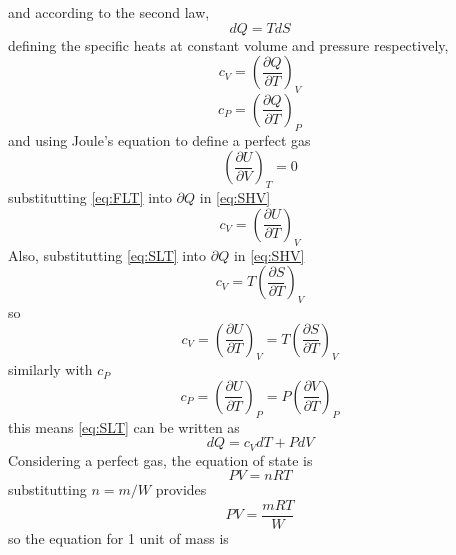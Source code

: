 %
%
and according to the second law,
\begin{equation}\label{SLT}
dQ=TdS
\end{equation}%
%
defining the specific heats at constant volume and pressure respectively,
\begin{equation}\label{eq:SHV}
c_V=\left(\frac{\partial Q}{\partial T}\right)_V
\end{equation}
\begin{equation}\label{eq:SHP}
c_P=\left(\frac{\partial Q}{\partial T}\right)_P
\end{equation}
and using Joule's equation to define a perfect gas
\begin{equation}\label{eq:Joule}
\left(\frac{\partial U}{\partial V}\right)_T=0
\end{equation}
substitutting \ref{eq:FLT} into $\partial Q$ in \ref{eq:SHV}
\begin{equation}
c_V=\left(\frac{\partial U}{\partial T}\right)_V
\end{equation}
Also, substitutting \ref{eq:SLT} into $\partial Q$ in \ref{eq:SHV}
\begin{equation}
c_V=T\left(\frac{\partial S}{\partial T}\right)_V
\end{equation}
so
\begin{equation}\label{eq:cV}
c_V=\left(\frac{\partial U}{\partial T}\right)_V=T\left(\frac{\partial S}{\partial T}\right)_V
\end{equation}
similarly with $c_P$
\begin{equation}\label{cP}
c_P=\left(\frac{\partial U}{\partial T}\right)_P=P\left(\frac{\partial V}{\partial T}\right)_P
\end{equation}
this means \ref{eq:SLT} can be written as
\begin{equation}\label{eq:NewSLT}
dQ=c_VdT+PdV
\end{equation}
Considering a perfect gas, the equation of state is
\begin{equation}\label{eq:IGL}
PV=nRT
\end{equation}%
%
substitutting $n=m/W$ provides%
\begin{equation}
PV=\frac{mRT}{W}
\end{equation}
so the equation for 1 unit of mass is
